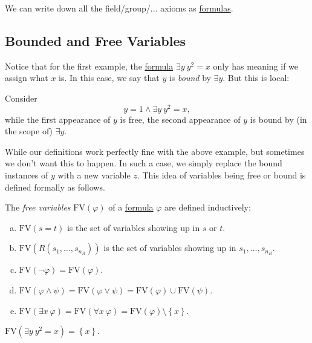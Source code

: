 \begin{eg}
	We can write down all the field/group/... axioms as \hyperref[def:formula]{formulas}.
\end{eg}

\subsection{Bounded and Free Variables}
Notice that for the first example, the \hyperref[def:formula]{formula} \(\exists y\ y^2 = x\) only has meaning if we assign what \(x\) is. In this case, we say that \(y\) is \emph{bound} by \(\exists y\). But this is local:

\begin{eg}
	Consider
	\[
		y=1 \land \exists y\ y^2 = x,
	\]
	while the first appearance of \(y\) is free, the second appearance of \(y\) is bound by (in the scope of) \(\exists y\).
\end{eg}

While our definitions work perfectly fine with the above example, but sometimes we don't want this to happen. In such a case, we simply replace the bound instances of \(y\) with a new variable \(z\). This idea of variables being free or bound is defined formally as follows.

\begin{definition}\label{def:free-variable}
	The \emph{free variables} \(\mathrm{FV}(\varphi )\) of a \hyperref[def:formula]{formula} \(\varphi \) are defined inductively:
	\begin{enumerate}[(a)]
		\item \(\mathrm{FV}(s=t) \) is the set of variables showing up in \(s\) or \(t\).
		\item \(\mathrm{FV}(R(s_1, \ldots , s_{n_R})) \) is the set of variables showing up in \(s_1, \ldots , s_{n_R}\).
		\item \(\mathrm{FV}(\lnot \varphi ) = \mathrm{FV} (\varphi )\).
		\item \(\mathrm{FV} (\varphi \land \psi ) = \mathrm{FV} (\varphi \lor \psi ) = \mathrm{FV}(\varphi ) \cup \mathrm{FV} (\psi ) \).
		\item \(\mathrm{FV} (\exists x\ \varphi ) = \mathrm{FV} (\forall x\ \varphi ) = \mathrm{FV} (\varphi ) \setminus \left\{ x \right\} \).
	\end{enumerate}
\end{definition}

\begin{eg}
	\(\mathrm{FV} (\exists y\ y^2 = x) = \left\{ x \right\} \).
\end{eg}

